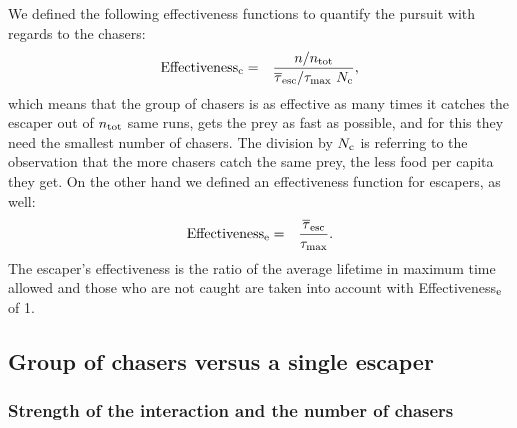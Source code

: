 \documentclass[12pt,a4paper,final]{iopart}
\begin{document}
We defined the following effectiveness functions to quantify the pursuit with regards to the chasers:
\begin{eqnarray}
{\rm Effectiveness_c} &= & \frac{n/n_{\rm tot}}{ \overline{\tau}_{\rm esc} / \tau_{\rm max} \  N_{\rm c}}, \label{eq:eff}
\end{eqnarray}
which means that the group of chasers is as effective as many times it catches the escaper out of $n_{\rm tot}$ same runs, gets the prey as fast as possible, and for this they need the smallest number of chasers. The division by $N_{\rm c}$ is referring to the observation that the more chasers catch the same prey, the less food per capita they get. On the other hand we defined an effectiveness function for escapers, as well:
\begin{eqnarray}
{\rm Effectiveness_e} & = & \frac{\overline{\tau}_{\rm esc}}{ \tau_{\rm max}}.
\end{eqnarray}
The escaper's effectiveness is the ratio of the average lifetime in maximum time allowed and those who are not caught are taken into account with Effectiveness$_{\rm e}$ of 1. 



\subsection{Group of chasers versus a single escaper}

\subsubsection{Strength of the interaction and the number of chasers}
\end{document}
